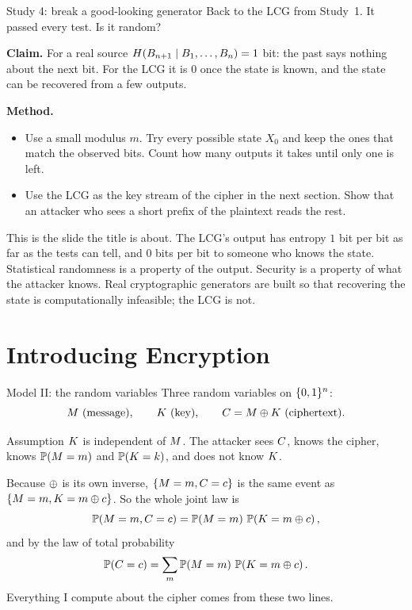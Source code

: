 \documentclass[10pt,aspectratio=169]{beamer}
\begin{document}
\begin{frame}{Study 4: break a good-looking generator}
  Back to the LCG from Study~1. It passed every test. Is it random?
  \medskip

  \textbf{Claim.} For a real source
  $H\!\left(B_{n+1} \mid B_1,\dots,B_n\right) = 1$ bit: the past says nothing about
  the next bit. For the LCG it is $0$ once the state is known, and the
  state can be recovered from a few outputs.
  \medskip

  \textbf{Method.}
  \begin{itemize}
    \item Use a small modulus $m$. Try every possible state $X_0$ and
          keep the ones that match the observed bits. Count how many
          outputs it takes until only one is left.
    \item Use the LCG as the key stream of the cipher in the next
          section. Show that an attacker who sees a short prefix of the
          plaintext reads the rest.
  \end{itemize}
  \medskip

  This is the slide the title is about. The LCG's output has entropy $1$
  bit per bit as far as the tests can tell, and $0$ bits per bit to
  someone who knows the state. Statistical randomness is a property of
  the output. Security is a property of what the attacker knows. Real
  cryptographic generators are built so that recovering the state is
  computationally infeasible; the LCG is not.
\end{frame}

\section[Encryption]{Introducing Encryption}

\begin{frame}{Model II: the random variables}
  Three random variables on $\{0,1\}^n$:
  \[
    M \text{ (message)}, \qquad K \text{ (key)}, \qquad
    C = M \oplus K \text{ (ciphertext)}.
  \]
  \begin{block}{Assumption}
    $K$ is independent of $M$. The attacker sees $C$, knows
    the cipher, knows $\mathbb{P}\!\left(M = m\right)$ and $\mathbb{P}\!\left(K = k\right)$, and does
    not know $K$.
  \end{block}
  \pause
  \medskip
  Because $\oplus$ is its own inverse, $\{M = m, C = c\}$ is the
  same event as $\{M = m, K = m \oplus c\}$. So the whole joint law
  is
  \[
    \mathbb{P}\!\left(M = m, C = c\right) = \mathbb{P}\!\left(M = m\right)\,\mathbb{P}\!\left(K = m \oplus c\right),
  \]
  and by the law of total probability
  \[
    \mathbb{P}\!\left(C = c\right) = \sum_{m} \mathbb{P}\!\left(M = m\right)\,\mathbb{P}\!\left(K = m \oplus c\right).
  \]
  Everything I compute about the cipher comes from these two lines.
\end{frame}
\end{document}
